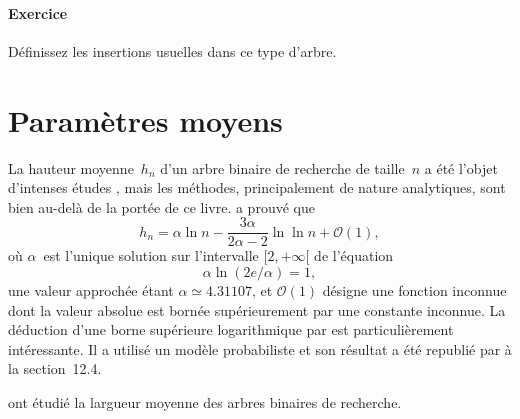\paragraph{Exercice}

Définissez les insertions usuelles dans ce type d'arbre.


\section{Paramètres moyens}

La hauteur moyenne~\(h_n\) d'un arbre binaire de recherche de
taille~\(n\) a été l'objet d'intenses études \citep{Devroye_1986,
  Devroye_1987, Mahmoud_1992, KnesslSpankowski_2002}, mais les
méthodes, principalement de nature analytiques, sont bien au-delà de
la portée de ce livre. \cite{Reed_2003} a prouvé que
\begin{equation*}
h_n = \alpha \ln n - \frac{3\alpha}{2\alpha - 2} \ln\ln n + \mathcal{O}(1),
\end{equation*}
où \(\alpha\)~est l'unique solution sur l'intervalle \([2,+\infty[\)
de l'équation
\begin{equation*}
\alpha\ln(2e/\alpha) = 1,
\end{equation*}
une valeur approchée étant \(\alpha \simeq 4.31107\), et
\(\mathcal{O}(1)\) désigne une fonction inconnue dont la valeur
absolue est bornée supérieurement par une constante inconnue. La
déduction d'une borne supérieure logarithmique par \cite{Aslam_2001}
est particulièrement intéressante. Il a utilisé un modèle probabiliste
et son résultat a été republié par \cite{CLRS_2009} à la section~12.4.

\cite{ChauvinDrmotaJabbour-Hattab_2001} ont étudié la largueur moyenne
des arbres binaires de recherche.
